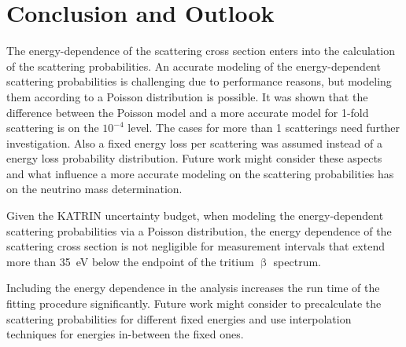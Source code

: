 \section{Conclusion and Outlook}
\label{sec:eDepScatCrossSecConclusion}
The energy-dependence of the scattering cross section enters into the calculation of the scattering probabilities. An accurate modeling of the energy-dependent scattering probabilities is challenging due to performance reasons, but modeling them according to a Poisson distribution is possible. It was shown that the difference between the Poisson model and a more accurate model for 1-fold scattering is on the $10^{-4}$ level. The cases for more than 1 scatterings need further investigation. Also a fixed energy loss per scattering was assumed instead of a energy loss probability distribution. Future work might consider these aspects and what influence a more accurate modeling on the scattering probabilities has on the neutrino mass determination.

Given the KATRIN uncertainty budget, when modeling the energy-dependent scattering probabilities via a Poisson distribution, the energy dependence of the scattering cross section is not negligible for measurement intervals that extend more than \SI{35}{eV} below the endpoint of the tritium $\upbeta$ spectrum.

Including the energy dependence in the analysis increases the run time of the fitting procedure significantly. Future work might consider to precalculate the scattering probabilities for different fixed energies and use interpolation techniques for energies in-between the fixed ones.
